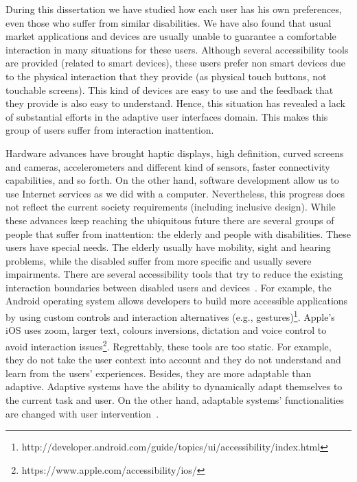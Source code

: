 During this dissertation we have studied how each user has his own preferences,
even those who suffer from similar disabilities. We have also found that usual 
market applications and devices are usually unable to guarantee a comfortable 
interaction in many situations for these users. Although several accessibility 
tools are provided (related to smart devices), these users prefer non smart 
devices due to the physical interaction that they provide (as physical touch 
buttons, not touchable screens). This kind of devices are easy to use and the 
feedback that they provide is also easy to understand. Hence, this situation has
revealed a lack of substantial efforts in the adaptive user interfaces domain. 
This makes this group of users suffer from interaction inattention.

Hardware advances have brought haptic displays, high definition, curved 
screens and cameras, accelerometers and different kind of sensors, faster 
connectivity capabilities, and so forth. On the other hand, software development
allow us to use Internet services as we did with a computer. Nevertheless,
this progress does not reflect the current society requirements (including
inclusive design). While these advances keep reaching the ubiquitous future
there are several groups of people that suffer from inattention: the elderly and
people with disabilities. These users have special needs. The elderly usually
have mobility, sight and hearing problems, while the disabled suffer from more
specific and usually severe impairments. There are several accessibility tools
that try to reduce the existing interaction boundaries between disabled users
and devices~\citep{gregor_designing_2002}\citep{burgstahler_designing_2002}.
For example, the Android operating system allows developers to build more accessible 
applications by using custom controls and interaction alternatives (e.g., 
gestures)\footnote{http://developer.android.com/guide/topics/ui/accessibility/index.html}.
Apple's iOS uses zoom, larger text, colours inversions, dictation and voice
control to avoid interaction issues\footnote{https://www.apple.com/accessibility/ios/}.
Regrettably, these tools are too static. For example, they do not take the user
context into account and they do not understand and learn from the users'
experiences. Besides, they are more adaptable than adaptive. Adaptive systems
have the ability to dynamically adapt themselves to the current task and user.
On the other hand, adaptable systems' functionalities are changed with user
intervention~\citep{fischer_user_2001}.

